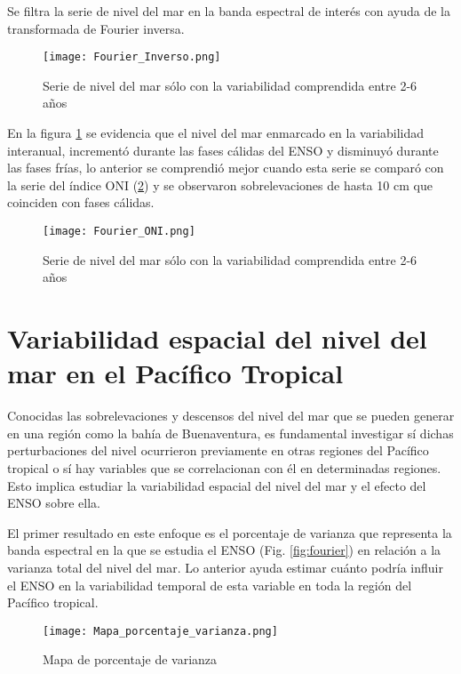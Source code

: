 Se filtra la serie de nivel del mar en la banda espectral de interés con ayuda de la transformada de Fourier inversa. 

\begin{figure}[H]
	\centering
	\texttt{[image: Fourier\_Inverso.png]}
	\caption{Serie de nivel del mar sólo con la variabilidad comprendida entre 2-6 años}
	\label{fig:fourier_inverso}
\end{figure}

En la figura \ref{fig:fourier_inverso} se evidencia que el nivel del mar enmarcado en la variabilidad interanual, incrementó durante las fases cálidas del ENSO y disminuyó durante las fases frías, lo anterior se comprendió mejor cuando esta serie se comparó con la serie del índice ONI (\ref{fig:fourier vs oni}) y se observaron sobrelevaciones de hasta 10 cm que coinciden con fases cálidas.

\begin{figure}[H]
	\centering
	\texttt{[image: Fourier\_ONI.png]}
	\caption{Serie de nivel del mar sólo con la variabilidad comprendida entre 2-6 años}
	\label{fig:fourier vs oni}
\end{figure}


\section{Variabilidad espacial del nivel del mar en el Pacífico Tropical}

Conocidas las sobrelevaciones y descensos del nivel del mar que se pueden generar en una región como la bahía de Buenaventura, es fundamental investigar sí dichas perturbaciones del nivel ocurrieron previamente en otras regiones del Pacífico tropical o sí hay variables que se correlacionan con él en determinadas regiones. Esto implica estudiar la variabilidad espacial del nivel del mar y el efecto del ENSO sobre ella.

El primer resultado en este enfoque es el porcentaje de varianza que representa la banda espectral en la que se estudia el ENSO (Fig. \ref{fig:fourier}) en relación a la varianza total del nivel del mar. Lo anterior ayuda estimar cuánto podría influir el ENSO en la variabilidad temporal de esta variable en toda la región del Pacífico tropical.

\begin{figure}[t]
	\centering
	\texttt{[image: Mapa\_porcentaje\_varianza.png]}
	\caption{Mapa de porcentaje de varianza}
	\label{fig:porcentaje_varianza}
\end{figure}

